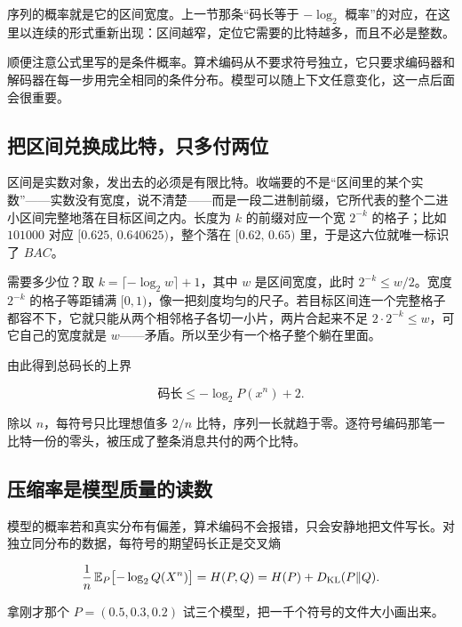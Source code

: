 序列的概率就是它的区间宽度。上一节那条``码长等于 \(-\log_2\) 概率''的对应，在这里以连续的形式重新出现：区间越窄，定位它需要的比特越多，而且不必是整数。

顺便注意公式里写的是条件概率。算术编码从不要求符号独立，它只要求编码器和解码器在每一步用完全相同的条件分布。模型可以随上下文任意变化，这一点后面会很重要。

\subsection{把区间兑换成比特，只多付两位}

区间是实数对象，发出去的必须是有限比特。收端要的不是``区间里的某个实数''——实数没有宽度，说不清楚——而是一段二进制前缀，它所代表的整个二进小区间完整地落在目标区间之内。长度为 \(k\) 的前缀对应一个宽 \(2^{-k}\) 的格子；比如 \(101000\) 对应 \([0.625,\,0.640625)\)，整个落在 \([0.62,\,0.65)\) 里，于是这六位就唯一标识了 \(BAC\)。

需要多少位？取 \(k=\lceil-\log_2 w\rceil+1\)，其中 \(w\) 是区间宽度，此时 \(2^{-k}\le w/2\)。宽度 \(2^{-k}\) 的格子等距铺满 \([0,1)\)，像一把刻度均匀的尺子。若目标区间连一个完整格子都容不下，它就只能从两个相邻格子各切一小片，两片合起来不足 \(2\cdot 2^{-k}\le w\)，可它自己的宽度就是 \(w\)——矛盾。所以至少有一个格子整个躺在里面。

由此得到总码长的上界

\[
\text{码长}\le -\log_2 P(x^n)+2 .
\]

除以 \(n\)，每符号只比理想值多 \(2/n\) 比特，序列一长就趋于零。逐符号编码那笔一比特一份的零头，被压成了整条消息共付的两个比特。

\subsection{压缩率是模型质量的读数}

模型的概率若和真实分布有偏差，算术编码不会报错，只会安静地把文件写长。对独立同分布的数据，每符号的期望码长正是交叉熵

\[
\frac1n\,\mathbb{E}_P\bigl[-\log_2 Q(X^n)\bigr]=H(P,Q)=H(P)+D_{\mathrm{KL}}(P\|Q).
\]

拿刚才那个 \(P=(0.5,0.3,0.2)\) 试三个模型，把一千个符号的文件大小画出来。

